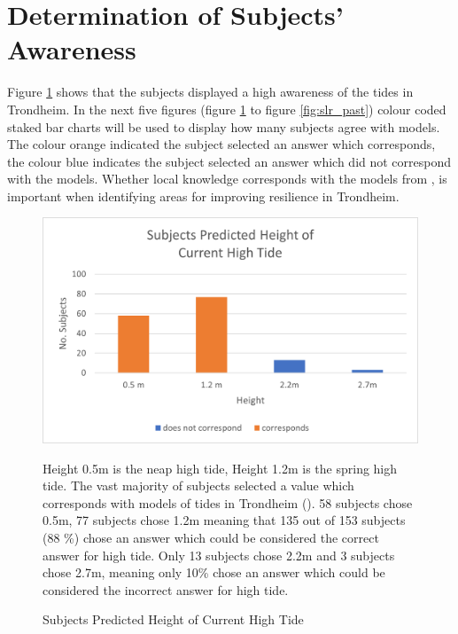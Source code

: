 \section{Determination of Subjects' Awareness}
Figure \ref{fig:high_tide_answer} shows that the subjects displayed a high awareness of the tides in Trondheim. In the next five figures (figure \ref{fig:high_tide_answer} to figure \ref{fig:slr_past}) colour coded staked bar charts will be used to display how many subjects agree with \cite{kartverket_se_2021} models. The colour orange indicated the subject selected an answer which corresponds, the colour blue indicates the subject selected an answer which did not correspond with the models. Whether local knowledge corresponds with the models from \cite{kartverket_se_2021}, is important when identifying areas for improving resilience in Trondheim.

\begin{figure}[H]
    \centering
    \includegraphics{fig_results/2022-hightide-answers.png}
    \caption{Subjects Predicted Height of Current High Tide}{ Height 0.5m is the neap high tide, Height 1.2m is the spring high tide. The vast majority of subjects selected a value which corresponds with models of tides in Trondheim (\cite{kartverket_se_2021}). 58 subjects chose 0.5m, 77 subjects chose 1.2m meaning that 135 out of 153 subjects (88 \%) chose an answer which could be considered the correct answer for high tide. Only 13 subjects chose 2.2m and 3 subjects chose 2.7m, meaning only 10\% chose an answer which could be considered the incorrect answer for high tide.}
    \label{fig:high_tide_answer}
\end{figure}
\paragraph{}

